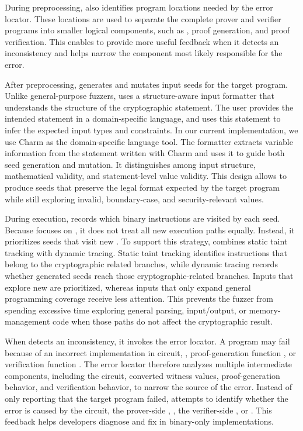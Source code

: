 During preprocessing, \greyboxfuzz also identifies program locations needed by the error locator. These locations are used to separate the complete prover and verifier programs into smaller logical components, such as , proof generation, and proof verification. This enables \greyboxfuzz to provide more useful feedback when it detects an inconsistency and helps narrow the component most likely responsible for the error.

After preprocessing, \greyboxfuzz generates and mutates input seeds for the target program. Unlike general-purpose fuzzers, \greyboxfuzz uses a structure-aware input formatter that understands the structure of the cryptographic statement. The user provides the intended statement in a domain-specific language, and \greyboxfuzz uses this statement to infer the expected input types and constraints. In our current implementation, we use Charm as the domain-specific language tool. The formatter extracts variable information from the statement written with Charm and uses it to guide both seed generation and mutation. It distinguishes among input structure, mathematical validity, and statement-level value validity. This design allows \greyboxfuzz to produce seeds that preserve the legal format expected by the target program while still exploring invalid, boundary-case, and security-relevant values.

During execution, \greyboxfuzz records which binary instructions are visited by each seed. Because \greyboxfuzz focuses on \logicerror, it does not treat all new execution paths equally. Instead, it prioritizes seeds that visit new \cryptobranch. To support this strategy, \greyboxfuzz combines static taint tracking with dynamic tracing. Static taint tracking identifies instructions that belong to the cryptographic related branches, while dynamic tracing records whether generated seeds reach those cryptographic-related branches. Inputs that explore new \cryptobranch are prioritized, whereas inputs that only expand general programming coverage receive less attention. This prevents the fuzzer from spending excessive time exploring general parsing, input/output, or memory-management code when those paths do not affect the cryptographic result.

When \greyboxfuzz detects an inconsistency, it invokes the error locator. A \zksnark program may fail because of an incorrect implementation in circuit, , proof-generation function \pfunc, or verification function \vfunc. The error locator therefore analyzes multiple intermediate components, including the circuit, converted witness values, proof-generation behavior, and verification behavior, to narrow the source of the error. Instead of only reporting that the target program failed, \greyboxfuzz attempts to identify whether the error is caused by the circuit, the prover-side , \pfunc, the verifier-side , or \vfunc. This feedback helps developers diagnose and fix \logicerror in binary-only \zksnark implementations.

